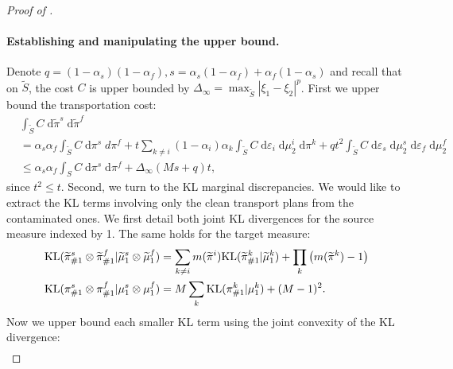 \begin{proof}[Proof of ]
  \paragraph{Establishing and manipulating the upper bound.}
  Denote $q = (1 - \alpha_s)(1 - \alpha_f), s = \alpha_s (1-\alpha_f) + \alpha_f (1 - \alpha_s)$
  and recall that on $\widetilde{S}$, the cost $C$ is upper bounded by
  $\Delta_{\infty} = \max_{\widetilde{S}}|\xi_1 - \xi_2|^p$.
  First we upper bound the transportation cost:
  \begin{equation}
    \label{seq:cost-split}
    \begin{split}
      &\int_{\widetilde{S}} C \; \mathrm d\widetilde{\pi}^s \; \mathrm d\widetilde{\pi}^f \\
      &= \alpha_s\alpha_f\int_{\widetilde{S}} C \; \mathrm d\pi^s \; d\pi^f +
      t \sum_{k \neq i} (1-\alpha_i) \alpha_k \int_{\widetilde{S}} C \;
      \mathrm d \varepsilon_i \; \mathrm d\mu^i_2  \; \mathrm d\pi^k +
      q t^2 \int_{\widetilde{S}} C \; \mathrm d \varepsilon_s \; \mathrm d\mu_2^s \;
      \mathrm d\varepsilon_f \; \mathrm d\mu^f_2 \\
      &\leq \alpha_s\alpha_f \int_{S} C \; \mathrm d\pi^s \;\mathrm d\pi^f +
      \Delta_{\infty}(Ms + q)t,
    \end{split}
  \end{equation}
  since $t^2 \leq t$. Second, we turn to the KL marginal discrepancies.
  We would like to extract the KL terms involving only the clean transport plans from
  the contaminated ones. We first detail both joint KL divergences for the source measure
  indexed by 1. The same holds for the target measure:
  \begin{equation}
  \label{seq:kl-split}
  \begin{split}
    &\text{KL}(\widetilde{\pi}^s_{\#1} \otimes \widetilde{\pi}^f_{\#1} \vert \widetilde{\mu}^s_1 \otimes \widetilde{\mu}^f_1) =
    \sum_{k \neq i} m(\widetilde{\pi}^i) \text{KL}(\widetilde{\pi}^k_{\#1} \vert \widetilde{\mu}^k_1) +
    \prod_{k} \big( m(\widetilde{\pi}^k) - 1 \big)\\
    &
    \text{KL}(\pi^s_{\#1} \otimes \pi^f_{\#1} \vert \mu^s_1 \otimes \mu^f_1) =
  M \sum_k \text{KL}(\pi^k_{\#1} \vert \mu^k_1) + (M-1)^2.
    \end{split}
  \end{equation}
  Now we upper bound each smaller KL term using the joint convexity of the KL divergence:
  \begin{equation}
    \begin{split}

\end{split}
\end{equation}
\end{proof}
